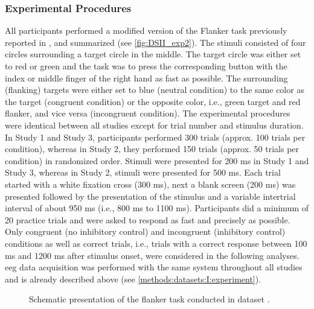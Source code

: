 \subsubsection{Experimental Procedures}
All participants performed a modified version of the Flanker task previously reported in \cite{Reuter2017, Winneke2012, Winneke2019}, and summarized \cite{Reuter2019} (see \autoref{fig:DSII_exp2}). The stimuli consisted of four circles surrounding a target circle in the middle. The target circle was either set to red or green and the task was to press the corresponding button with the index or middle finger of the right hand as fast as possible. The surrounding (flanking) targets were either set to blue (neutral condition) to the same color as the target (congruent condition) or the opposite color, i.e., green target and red flanker, and vice versa (incongruent condition). The experimental procedures were identical between all studies except for trial number and stimulus duration. In Study 1 and Study 3, participants performed 300 trials (approx. 100 trials per condition), whereas in Study 2, they performed 150 trials (approx. 50 trials per condition) in randomized order. Stimuli were presented for 200 ms in Study 1 and Study 3, whereas in Study 2, stimuli were presented for 500 ms. Each trial started with a white fixation cross (300 ms), next a blank screen (200 ms) was presented followed by the presentation of the stimulus and a variable intertrial interval of about 950 ms (i.e., 800 ms to 1100 ms). Participants did a minimum of 20 practice trials and were asked to respond as fast and precisely as possible. Only congruent (no inhibitory control) and incongruent (inhibitory control) conditions as well as correct trials, i.e., trials with a correct response between 100 ms and 1200 ms after stimulus onset, were considered in the following analyses.\\
\Gls{eeg} data acquisition was performed with the same system throughout all studies and is already described above (see \autoref{methods:datasets:I:experiment}). 

\begin{figure}[h]
\begin{center}

\caption[Schematic presentation of the flanker task conducted in dataset .]{Schematic presentation of the flanker task conducted in dataset .}
\label{fig:DSII_exp2}
\end{center}
\end{figure}

